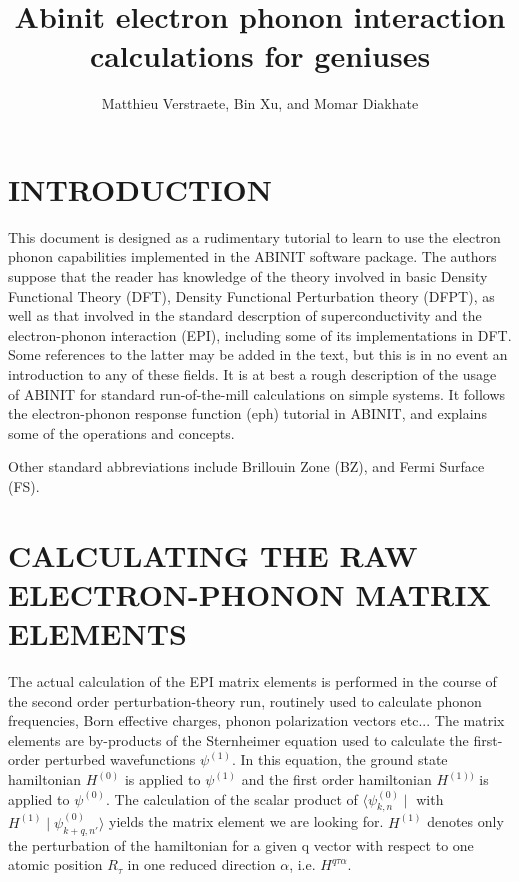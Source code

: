 \documentclass[aps,preprint]{revtex4-1}
\begin{document}
\title {Abinit electron phonon interaction calculations for geniuses}
\author{Matthieu Verstraete, Bin Xu, and Momar Diakhate}

\maketitle

\section{INTRODUCTION}
This document is designed as a rudimentary tutorial to learn to use the
electron phonon capabilities implemented in the ABINIT software package. The
authors suppose that the reader has knowledge of the theory involved in basic
Density Functional Theory (DFT)\cite{ABINIT_short, payne_1992_review_dft,
hohenberg_1964_DFT, kohn_1965_DFT_LDA}, Density Functional Perturbation theory
(DFPT)\cite{baroni_1987_elast_const_lin_resp, baroni_2001_phonon_review,
gonze_1989_DFT_nonlinear_response, gonze_1997_higher_order_DFTPT,
gonze_1995_perturbation_variational}, as well as that involved in the standard
descrption of superconductivity and the electron-phonon interaction
(EPI)\cite{allen_1982_superconducting_tc}, including some of its
implementations in DFT\cite{dacorogna_1985_EPI, lam_1986_EPI,
savrasov_1996_EPI_implementation}. Some references to the latter may be added
in the text, but this is in no event an introduction to any of these fields.
It is at best a rough description of the usage of ABINIT for standard
run-of-the-mill calculations on simple systems. It follows the electron-phonon response
function (eph) tutorial in ABINIT, and explains some of the operations and concepts.

Other standard abbreviations include Brillouin Zone (BZ), and Fermi Surface
(FS).

\section{CALCULATING THE RAW ELECTRON-PHONON MATRIX ELEMENTS}

The actual calculation of the EPI matrix elements is performed in the course of
the second order perturbation-theory run, routinely used to calculate phonon
frequencies, Born effective charges, phonon polarization vectors etc... The
matrix elements are by-products of the Sternheimer equation used to calculate
the first-order perturbed wavefunctions $\psi^{(1)}$. In this equation, the
ground state hamiltonian $H^{(0)}$ is applied to $\psi^{(1)}$ and the first
order hamiltonian $H^{(1))}$ is applied to $\psi^{(0)}$. The calculation of the
scalar product of $\langle \psi^{(0)}_{k,n} \mid$ with $H^{(1)} \mid
\psi^{(0)}_{k+q,n'} \rangle$ yields the matrix element we are looking for. $H^{(1)}$
denotes only the perturbation of the hamiltonian for a given q vector with
respect to one atomic position $R_\tau$ in one reduced direction $\alpha$, i.e.
$H^{q \tau \alpha}$.
\end{document}
